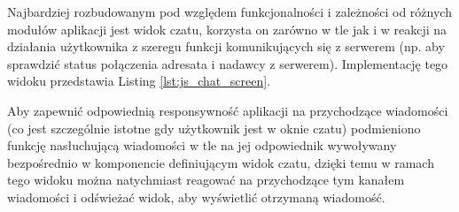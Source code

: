 \documentclass[../main.tex]{subfiles}
\begin{document}
Najbardziej rozbudowanym pod względem funkcjonalności i zależności od różnych modułów aplikacji jest widok czatu, korzysta on zarówno w tle jak i w reakcji na działania użytkownika z szeregu funkcji komunikujących się z serwerem (np. aby sprawdzić status połączenia adresata i nadawcy z serwerem). Implementację tego widoku przedstawia Listing \ref{lst:js_chat_screen}.

Aby zapewnić odpowiednią responsywność aplikacji na przychodzące wiadomości (co jest szczególnie istotne gdy użytkownik jest w oknie czatu) podmieniono funkcję nasłuchującą wiadomości w tle na jej odpowiednik wywoływany bezpośrednio w komponencie definiującym widok czatu, dzięki temu w ramach tego widoku można natychmiast reagować na przychodzące tym kanałem wiadomości i odświeżać widok, aby wyświetlić otrzymaną wiadomość.
\end{document}
